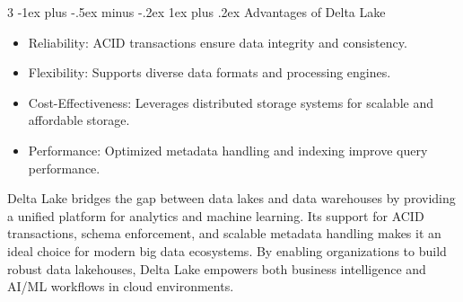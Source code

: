 \documentclass[a4paper, 9pt, landscape]{article}
\makeatletter
\renewcommand{\subsubsection}{\@startsection{subsubsection}{3}{0mm}%
                                {-1ex plus -.5ex minus -.2ex}%
                                {1ex plus .2ex}%
                                {\normalfont\small\bfseries}}
\makeatother
\begin{document}
\begin{multicols*}{3}
\subsubsection{Advantages of Delta Lake}
\begin{itemize}
\item Reliability: ACID transactions ensure data integrity and consistency.
\item Flexibility: Supports diverse data formats and processing engines.
\item Cost-Effectiveness: Leverages distributed storage systems for scalable and affordable storage.
\item Performance: Optimized metadata handling and indexing improve query performance.
\end{itemize}
Delta Lake bridges the gap between data lakes and data warehouses by providing a unified platform for analytics and machine learning. Its support for ACID transactions, schema enforcement, and scalable metadata handling makes it an ideal choice for modern big data ecosystems. By enabling organizations to build robust data lakehouses, Delta Lake empowers both business intelligence and AI/ML workflows in cloud environments.












\end{multicols*}
\end{document}
